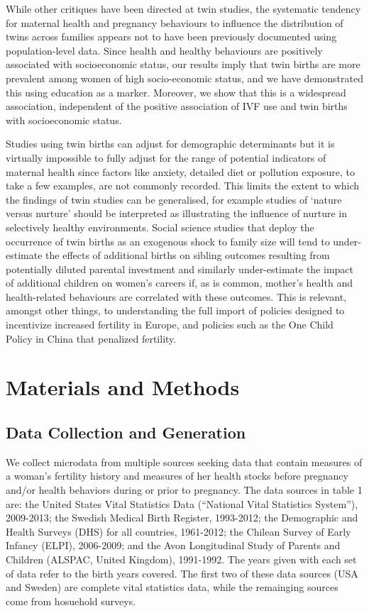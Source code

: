 \documentclass[11pt]{article}
\begin{document}
While other critiques have been directed at twin studies, the systematic tendency for maternal health and pregnancy behaviours to influence the distribution of twins across families appears not to have been previously documented using population-level data. Since health and healthy behaviours are positively associated with socioeconomic status, our results imply that twin births are more prevalent among women of high socio-economic status, and we have demonstrated this using education as a marker. Moreover, we show that this is a widespread association, independent of the positive association of IVF use and twin births with socioeconomic status.

Studies using twin births can adjust for demographic determinants but it is virtually impossible to fully adjust for the range of potential indicators of maternal health since factors like anxiety, detailed diet or pollution exposure, to take a few examples, are not commonly recorded. This limits the extent to which the findings of twin studies can be generalised, for example studies of `nature versus nurture' should be interpreted as illustrating the influence of nurture in selectively healthy environments. Social science studies that deploy the occurrence of twin births as an exogenous shock to family size will tend to under-estimate the effects of additional births on sibling outcomes resulting from potentially diluted parental investment and similarly under-estimate the impact of additional children on women's careers if, as is common, mother's health and health-related behaviours are correlated with these outcomes. This is relevant, amongst other things, to understanding the full import of policies designed to incentivize increased fertility in Europe, and policies such as the One Child Policy in China that penalized fertility.

\section*{Materials and Methods}
\subsection*{Data Collection and Generation}
We collect microdata from multiple sources seeking data that contain measures of a woman's fertility history and measures of her health stocks before pregnancy and/or health behaviors during or prior to pregnancy.  The data sources in table 1 are: the United States Vital Statistics Data (``National Vital Statistics System''), 2009-2013; the Swedish Medical Birth Register, 1993-2012; the Demographic and Health Surveys (DHS) for all countries, 1961-2012; the Chilean Survey of Early Infancy (ELPI), 2006-2009; and the Avon Longitudinal Study of Parents and Children (ALSPAC, United Kingdom), 1991-1992.  The years given with each set of data refer to the birth years covered.  The first two of these data sources (USA and Sweden) are complete vital statistics data, while the remainging sources come from hosuehold surveys.
\end{document}
